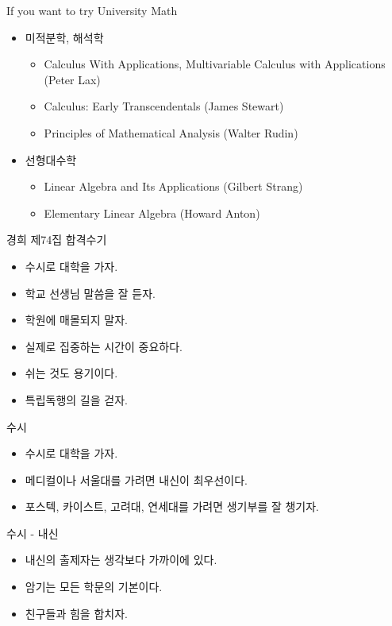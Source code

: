 \documentclass[12pt,aspectratio=169]{beamer}
\newenvironment{mainitemize}{\begin{itemize}\setlength{\itemsep}{0.72em}}{\end{itemize}}
\newenvironment{subitemize}{\begin{itemize}\setlength{\itemsep}{0.22em}}{\end{itemize}}
\begin{document}
\begin{frame}{If you want to try University Math}
\begin{mainitemize}
  \item 미적분학, 해석학
    \begin{subitemize}
      \item Calculus With Applications, Multivariable Calculus with Applications (Peter Lax)
      \item Calculus: Early Transcendentals (James Stewart)
      \item Principles of Mathematical Analysis (Walter Rudin)
    \end{subitemize}
  \item 선형대수학
    \begin{subitemize}
      \item Linear Algebra and Its Applications (Gilbert Strang)
      \item Elementary Linear Algebra (Howard Anton)
    \end{subitemize}
\end{mainitemize}
\end{frame}

\begin{frame}{경희 제74집 합격수기}
\begin{mainitemize}
  \item 수시로 대학을 가자.
  \item 학교 선생님 말씀을 잘 듣자.
  \item 학원에 매몰되지 말자.
  \item 실제로 집중하는 시간이 중요하다.
  \item 쉬는 것도 용기이다.
  \item 특립독행의 길을 걷자.
\end{mainitemize}
\end{frame}

\begin{frame}{수시}
\begin{mainitemize}
  \item 수시로 대학을 가자.
  \item 메디컬이나 서울대를 가려면 내신이 최우선이다.
  \item 포스텍, 카이스트, 고려대, 연세대를 가려면 생기부를 잘 챙기자.
\end{mainitemize}
\end{frame}

\begin{frame}{수시 - 내신}
\begin{mainitemize}
  \item 내신의 출제자는 생각보다 가까이에 있다.
  \item 암기는 모든 학문의 기본이다.
  \item 친구들과 힘을 합치자.
\end{mainitemize}
\end{frame}
\end{document}
